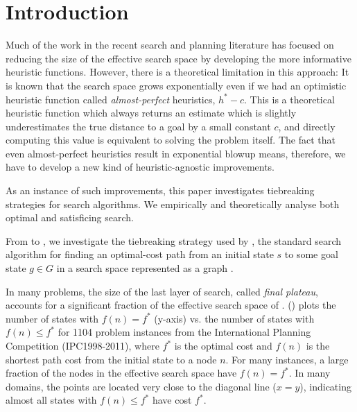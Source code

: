 
\section{Introduction}
\label{sec:introduction}

Much of the work in the recent search and planning literature has focused on
reducing the size of the effective search space by developing the more
informative heuristic functions. However, there is a theoretical
limitation in this approach: It is known that the search space grows
exponentially \cite{helmert2008good} even if we had an optimistic
heuristic function called \emph{almost-perfect} heuristics,
$h^*-c$. This is a
theoretical heuristic function which always returns an estimate which is
slightly underestimates the true distance to a goal by a small constant
$c$, and directly computing this value is equivalent to solving the
problem itself.
The fact that even almost-perfect heuristics result in exponential blowup 
means, therefore, we have to develop
a new kind of heuristic-agnostic improvements.

As an instance of such improvements, this paper investigates tiebreaking
strategies for search algorithms. We empirically and theoretically
analyse both optimal and satisficing search.


From  to , we investigate
the tiebreaking strategy used by \astar, the standard search algorithm
for finding an optimal-cost path from an initial state $s$ to some goal
state $g \in G$ in a search space represented as a graph
\cite{hart1968formal}. 

In many problems, the size of the last layer of search, called
\emph{final plateau}, accounts for a significant fraction of the
effective search space of \astar.  
() plots the number of states with $f(n) = f^*$
(y-axis) vs. the number of states with $f(n) \leq f^*$ for 1104 problem
instances from the International Planning Competition (IPC1998-2011),
where $f^*$ is the optimal cost and $f(n)$ is the shortest path cost
from the initial state to a node $n$.  For many instances, a large
fraction of the nodes in the effective search space have $f(n)=f^*$.
In many domains, the points are located very close to the diagonal line
($x=y$), indicating almost all states with $f(n) \leq f^*$ have cost
$f^*$.


